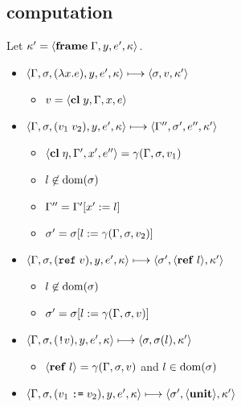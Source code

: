\documentclass{article}
\begin{document}
\begin{minipage}{\textwidth}
\begin{minipage}[t]{0.50\textwidth}

\subsection{computation}
Let $\kappa' = \langle\mathbf{frame}\; \Gamma,y,e',\kappa\rangle$.

\begin{itemize}
\item $\langle\Gamma,\sigma,(\lambda x.e),y,e',\kappa\rangle \longmapsto \langle \sigma,v, \kappa'\rangle$

\begin{itemize}
\item $v = \langle\mathbf{cl}\; y,\Gamma,x,e\rangle$
\end{itemize}

\item $\langle\Gamma,\sigma,(v_1\;v_2),y,e',\kappa\rangle \longmapsto \langle\Gamma'',\sigma',e'',\kappa'\rangle$

\begin{itemize}
\item $\langle\mathbf{cl}\; \eta,\Gamma',x',e''\rangle=\gamma(\Gamma,\sigma,v_1)$
\item $l\not\in\operatorname{dom}(\sigma)$
\item $\Gamma''=\Gamma'[x':= l]$
\item $\sigma'=\sigma[l:= \gamma(\Gamma,\sigma,v_2)]$
\end{itemize}

\item $\langle\Gamma,\sigma,(\mathtt{ref}\; v),y,e',\kappa\rangle \longmapsto \langle\sigma', \langle\mathbf{ref}\; l\rangle,\kappa'\rangle$

\begin{itemize}
  \item $l\not\in\operatorname{dom}(\sigma)$
  \item $\sigma'=\sigma[l:= \gamma(\Gamma,\sigma,v)]$
\end{itemize}

\item $\langle\Gamma,\sigma,(\text{\texttt{!}}v),y,e',\kappa\rangle \longmapsto \langle\sigma, \sigma(l),\kappa'\rangle$

\begin{itemize}
\item $\langle\mathbf{ref}\; l\rangle=\gamma(\Gamma,\sigma,v)$ and $l\in\operatorname{dom}(\sigma)$
\end{itemize}

\item $\langle\Gamma,\sigma,(v_1\; \text{\texttt{:=}}\; v_2),y,e',\kappa\rangle \longmapsto \langle\sigma',\langle\mathbf{unit}\rangle,\kappa'\rangle$


\end{itemize}
\end{minipage}
\end{minipage}
\end{document}
